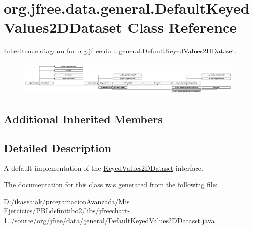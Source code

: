 \hypertarget{classorg_1_1jfree_1_1data_1_1general_1_1_default_keyed_values2_d_dataset}{}\section{org.\+jfree.\+data.\+general.\+Default\+Keyed\+Values2\+D\+Dataset Class Reference}
\label{classorg_1_1jfree_1_1data_1_1general_1_1_default_keyed_values2_d_dataset}
Inheritance diagram for org.\+jfree.\+data.\+general.\+Default\+Keyed\+Values2\+D\+Dataset\+:\begin{figure}[H]
\begin{center}
\leavevmode
\includegraphics[height=1.744548cm]{classorg_1_1jfree_1_1data_1_1general_1_1_default_keyed_values2_d_dataset}
\end{center}
\end{figure}
\subsection*{Additional Inherited Members}


\subsection{Detailed Description}
A default implementation of the \mbox{\hyperlink{interfaceorg_1_1jfree_1_1data_1_1general_1_1_keyed_values2_d_dataset}{Keyed\+Values2\+D\+Dataset}} interface. 

The documentation for this class was generated from the following file\+:\begin{DoxyCompactItemize}
\item 
D\+:/ikasgaiak/programacion\+Avanzada/\+Mis Ejercicios/\+P\+B\+Ldefinitibo2/libs/jfreechart-\/1../source/org/jfree/data/general/\mbox{\hyperlink{_default_keyed_values2_d_dataset_8java}{Default\+Keyed\+Values2\+D\+Dataset.\+java}}\end{DoxyCompactItemize}
